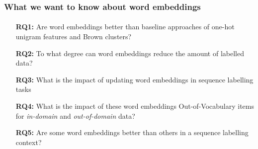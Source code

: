 \documentclass{beamer}
\begin{document}
\begin{frame}
\frametitle{What we want to know about word embeddings}
  \framesubtitle{}

\begin{itemize}
\item[\bf RQ1:] Are word embeddings better than baseline approaches of one-hot unigram features and Brown clusters?
\item[]
\item[\bf RQ2:] 
To what degree can word embeddings reduce the amount of labelled data?
\item[]
\item[\bf RQ3:] What is the impact of updating word embeddings in sequence
  labelling tasks
\item[]
\item[\bf RQ4:] What is the impact of these word embeddings Out-of-Vocabulary items for \textit{in-domain} and \textit{out-of-domain} data?
\item[]
\item[\bf RQ5:] Are some word embeddings better than others in a sequence labelling context?
\end{itemize}
\end{frame}
\end{document}
